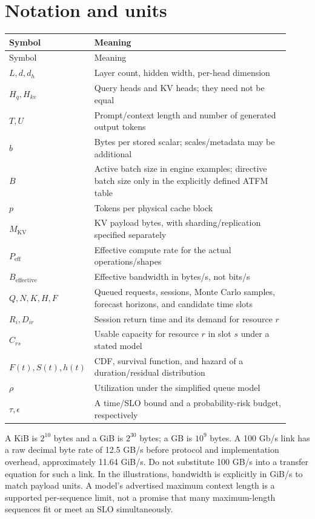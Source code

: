 \section{Notation and units}
\begin{longtable}{@{}p{0.19\linewidth}p{0.73\linewidth}@{}}
\toprule Symbol & Meaning\\\midrule\endfirsthead
\toprule Symbol & Meaning\\\midrule\endhead
$L,d,d_h$ & Layer count, hidden width, per-head dimension\\
$H_q,H_{kv}$ & Query heads and KV heads; they need not be equal\\
$T,U$ & Prompt/context length and number of generated output tokens\\
$b$ & Bytes per stored scalar; scales/metadata may be additional\\
$B$ & Active batch size in engine examples; directive batch size only in the explicitly defined ATFM table\\
$p$ & Tokens per physical cache block\\
$M_{\mathrm{KV}}$ & KV payload bytes, with sharding/replication specified separately\\
$P_{\mathrm{eff}}$ & Effective compute rate for the actual operations/shapes\\
$B_{\mathrm{effective}}$ & Effective bandwidth in bytes/s, not bits/s\\
$Q,N,K,H,F$ & Queued requests, sessions, Monte Carlo samples, forecast horizons, and candidate time slots\\
$R_i,D_{ir}$ & Session return time and its demand for resource $r$\\
$C_{rs}$ & Usable capacity for resource $r$ in slot $s$ under a stated model\\
$F(t),S(t),h(t)$ & CDF, survival function, and hazard of a duration/residual distribution\\
$\rho$ & Utilization under the simplified queue model\\
$\tau,\epsilon$ & A time/SLO bound and a probability-risk budget, respectively\\\bottomrule
\end{longtable}

A KiB is $2^{10}$ bytes and a GiB is $2^{30}$ bytes; a GB is $10^9$ bytes.
A 100 Gb/s link has a raw decimal byte rate of 12.5 GB/s before protocol and
implementation overhead, approximately 11.64 GiB/s. Do not substitute 100 GB/s
into a transfer equation for such a link. In the illustrations, bandwidth is
explicitly in GiB/s to match payload units. A model's advertised maximum context
length is a supported per-sequence limit, not a promise that many maximum-length
sequences fit or meet an SLO simultaneously.

